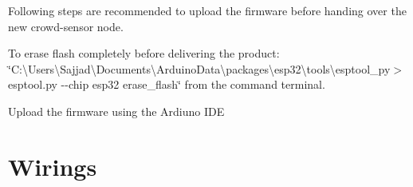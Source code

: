 Following steps are recommended to upload the firmware before handing over the new crowd-\/sensor node.
\begin{DoxyEnumerate}
\item To erase flash completely before delivering the product\+: \char`\"{}\+C\+:\textbackslash{}\+Users\textbackslash{}\+Sajjad\textbackslash{}\+Documents\textbackslash{}\+Arduino\+Data\textbackslash{}packages\textbackslash{}esp32\textbackslash{}tools\textbackslash{}esptool\+\_\+py$>$esptool.\+py -\/-\/chip esp32 erase\+\_\+flash\char`\"{} from the command terminal.
\item Upload the firmware using the Ardiuno I\+DE
\end{DoxyEnumerate}\hypertarget{index_wiring}{}\section{Wirings}\label{index_wiring}

